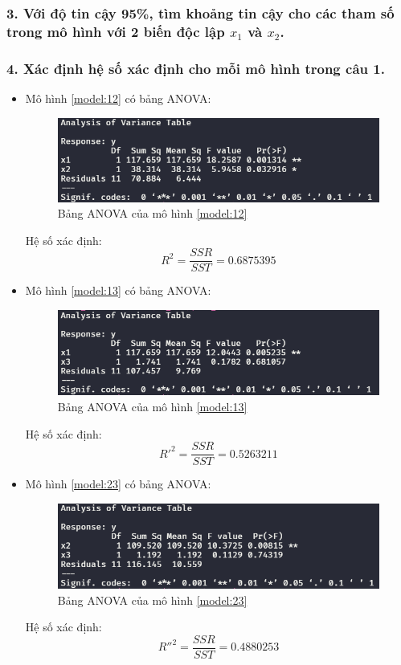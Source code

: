 \documentclass[a4paper]{article}
\theoremstyle{nonumberplain}
\begin{document}
\subsubsection*{3. Với độ tin cậy 95\%, tìm khoảng tin cậy cho các tham số trong mô hình với 2 biến độc lập $x_1$ và $x_2$.}


\subsubsection*{4. Xác định hệ số xác định cho mỗi mô hình trong câu 1.}

\begin{itemize}
	\item Mô hình \ref{model:12} có bảng ANOVA:
	\begin{figure}[h]
		\centering
		\includegraphics[width=0.7\linewidth]{bai-3-5-anova-1}
		\caption{Bảng ANOVA của mô hình \ref{model:12}}
		\label{fig:bai-3-5-anova-1}
	\end{figure}
	
	Hệ số xác định:
	\[R^2 = \dfrac{SSR}{SST} = 0.6875395\]
	
	\item Mô hình \ref{model:13} có bảng ANOVA:
	\begin{figure}[h]
		\centering
		\includegraphics[width=0.7\linewidth]{bai-3-5-anova-2}
		\caption{Bảng ANOVA của mô hình \ref{model:13}}
		\label{fig:bai-3-5-anova-2}
	\end{figure}
	
	Hệ số xác định:
	\[R'^2 = \dfrac{SSR}{SST} = 0.5263211\]
	
	\item Mô hình \ref{model:23} có bảng ANOVA:
	\begin{figure}[h]
		\centering
		\includegraphics[width=0.7\linewidth]{bai-3-5-anova-3}
		\caption{Bảng ANOVA của mô hình \ref{model:23}}
		\label{fig:bai-3-5-anova-3}
	\end{figure}
	
	Hệ số xác định:
	\[R''^2 = \dfrac{SSR}{SST} = 0.4880253\]
\end{itemize}
\end{document}
